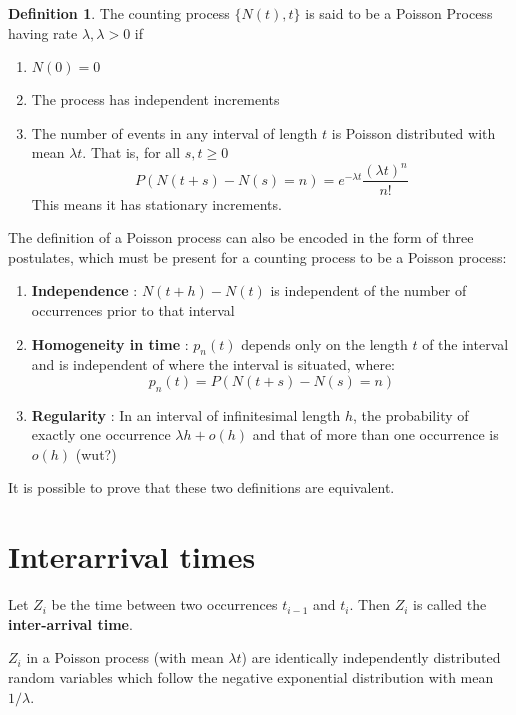 \documentclass[12pt,letterpaper]{amsbook}
\theoremstyle{definition}
\newtheorem{definition}{Definition}%
\begin{document}
\begin{definition}
  The counting process $\{N(t),t\}$ is said to be a Poisson Process having rate $\lambda, \lambda > 0$ if 
  \begin{enumerate}
    \item $N(0) = 0$
    \item The process has independent increments
    \item The number of events in any interval of length $t$ is Poisson distributed with mean $\lambda t$. That is, for all $s,t \geq 0$
      \[P(N(t+s) - N(s) = n) = e^{- \lambda t}\frac{(\lambda t) ^ n}{n!}\]
      This means it has stationary increments.
  \end{enumerate}
\end{definition}

The definition of a Poisson process can also be encoded in the form of three postulates, which must be present for a counting process to be a Poisson process:

\begin{enumerate}
  \item \textbf{Independence} : $N(t+h) - N(t)$ is independent of the number of occurrences prior to that interval
  \item \textbf{Homogeneity in time} : $p_n(t)$ depends only on the length $t$ of the interval and is independent of where the interval is situated, where:
    \[p_n(t) = P(N(t+s) - N(s) = n)\]
  \item \textbf{Regularity} : In an interval of infinitesimal length $h$, the probability of exactly one occurrence $\lambda h + o(h)$ and that of more than one occurrence is $o(h)$ (wut?)
\end{enumerate}

It is possible to prove that these two definitions are equivalent.

\section{Interarrival times}

Let $Z_i$ be the time between two occurrences $t_{i-1}$ and $t_i$. Then $Z_i$ is called the \textbf{inter-arrival time}.

\begin{theorem}
  $Z_i$ in a Poisson process (with mean $\lambda t$) are identically independently distributed random variables which follow the negative exponential distribution with mean $1/\lambda$.
\end{theorem}
\end{document}
